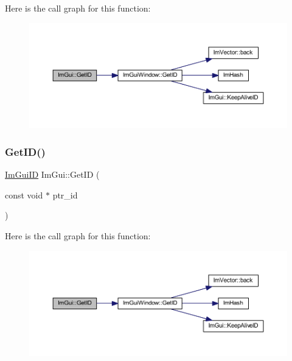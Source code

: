 Here is the call graph for this function\+:
\nopagebreak
\begin{figure}[H]
\begin{center}
\leavevmode
\includegraphics[width=350pt]{namespace_im_gui_a26064d74efebef3aa86e1a78b3e4c333_cgraph}
\end{center}
\end{figure}
\mbox{\label{namespace_im_gui_a220123ad62c2180ded92b2ef91f27c5a}} 
\subsubsection{\texorpdfstring{Get\+I\+D()}{GetID()}\hspace{0.1cm}{\footnotesize\ttfamily [3/3]}}
{\footnotesize\ttfamily \mbox{\hyperlink{imgui_8h_a1785c9b6f4e16406764a85f32582236f}{Im\+Gui\+ID}} Im\+Gui\+::\+Get\+ID (\begin{DoxyParamCaption}\item[{const void $\ast$}]{ptr\+\_\+id }\end{DoxyParamCaption})}

Here is the call graph for this function\+:
\nopagebreak
\begin{figure}[H]
\begin{center}
\leavevmode
\includegraphics[width=350pt]{namespace_im_gui_a220123ad62c2180ded92b2ef91f27c5a_cgraph}
\end{center}
\end{figure}
\mbox{\label{namespace_im_gui_a3179e560812f878f3961ce803a5d9302}} 
